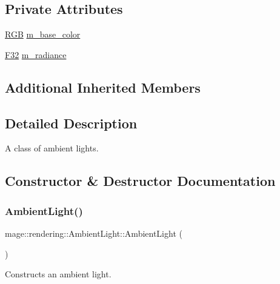 \subsection*{Private Attributes}
\begin{DoxyCompactItemize}
\item 
\hyperlink{structmage_1_1_r_g_b}{R\+GB} \hyperlink{classmage_1_1rendering_1_1_ambient_light_a28527ee932d424f43686c1abe9c0f3ec}{m\+\_\+base\+\_\+color}
\item 
\hyperlink{namespacemage_aa97e833b45f06d60a0a9c4fc22ae02c0}{F32} \hyperlink{classmage_1_1rendering_1_1_ambient_light_adfdafe01958a72df46eeb3c0f5f0d0c4}{m\+\_\+radiance}
\end{DoxyCompactItemize}
\subsection*{Additional Inherited Members}


\subsection{Detailed Description}
A class of ambient lights. 

\subsection{Constructor \& Destructor Documentation}
\hypertarget{classmage_1_1rendering_1_1_ambient_light_a178327bf02552f65b98ad3858416a81d}{}\label{classmage_1_1rendering_1_1_ambient_light_a178327bf02552f65b98ad3858416a81d} 
\subsubsection{\texorpdfstring{Ambient\+Light()}{AmbientLight()}\hspace{0.1cm}{\footnotesize\ttfamily [1/3]}}
{\footnotesize\ttfamily mage\+::rendering\+::\+Ambient\+Light\+::\+Ambient\+Light (\begin{DoxyParamCaption}{ }\end{DoxyParamCaption})\hspace{0.3cm}{\ttfamily [noexcept]}}

Constructs an ambient light. \hypertarget{classmage_1_1rendering_1_1_ambient_light_a363ca4f79eef6f0a95a2e3d381479af1}{}\label{classmage_1_1rendering_1_1_ambient_light_a363ca4f79eef6f0a95a2e3d381479af1} 
